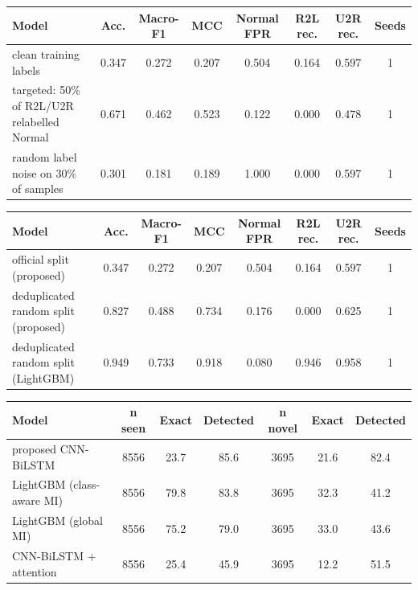 \begin{tabular}{lccccccc}
\toprule
Model & Acc. & Macro-F1 & MCC & Normal FPR & R2L rec. & U2R rec. & Seeds \\
\midrule
clean training labels & 0.347 & 0.272 & 0.207 & 0.504 & 0.164 & 0.597 & 1 \\
targeted: 50\% of R2L/U2R relabelled Normal & 0.671 & 0.462 & 0.523 & 0.122 & 0.000 & 0.478 & 1 \\
random label noise on 30\% of samples & 0.301 & 0.181 & 0.189 & 1.000 & 0.000 & 0.597 & 1 \\
\bottomrule
\end{tabular}

\begin{tabular}{lccccccc}
\toprule
Model & Acc. & Macro-F1 & MCC & Normal FPR & R2L rec. & U2R rec. & Seeds \\
\midrule
official split (proposed) & 0.347 & 0.272 & 0.207 & 0.504 & 0.164 & 0.597 & 1 \\
deduplicated random split (proposed) & 0.827 & 0.488 & 0.734 & 0.176 & 0.000 & 0.625 & 1 \\
deduplicated random split (LightGBM) & 0.949 & 0.733 & 0.918 & 0.080 & 0.946 & 0.958 & 1 \\
\bottomrule
\end{tabular}

\begin{tabular}{lcccccc}
\toprule
Model & n seen & Exact & Detected & n novel & Exact & Detected \\
\midrule
proposed CNN-BiLSTM & 8556 & 23.7 & 85.6 & 3695 & 21.6 & 82.4 \\
LightGBM (class-aware MI) & 8556 & 79.8 & 83.8 & 3695 & 32.3 & 41.2 \\
LightGBM (global MI) & 8556 & 75.2 & 79.0 & 3695 & 33.0 & 43.6 \\
CNN-BiLSTM + attention & 8556 & 25.4 & 45.9 & 3695 & 12.2 & 51.5 \\
\bottomrule
\end{tabular}

